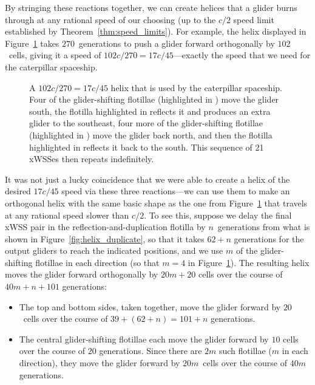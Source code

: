 By stringing these reactions together, we can create helices that a glider burns through at any rational speed of our choosing (up to the $c/2$ speed limit established by Theorem~\ref{thm:speed_limits}). For example, the helix displayed in Figure~\ref{fig:caterpillar_helix} takes $270$~generations to push a glider forward orthogonally by $102$~cells, giving it a speed of $102c/270 = 17c/45$---exactly the speed that we need for the caterpillar spaceship.

\begin{figure}[!htb]
	\centering
	\caption{A $102c/270 = 17c/45$ helix that is used by the caterpillar spaceship. Four of the glider-shifting flotillae (highlighted in ) move the glider south, the flotilla highlighted in  reflects it and produces an extra glider to the southeast, four more of the glider-shifting flotillae (highlighted in ) move the glider back north, and then the flotilla highlighted in  reflects it back to the south. This sequence of 21 xWSSes then repeats indefinitely.}\label{fig:caterpillar_helix}
\end{figure}

It was not just a lucky coincidence that we were able to create a helix of the desired $17c/45$ speed via these three reactions---we can use them to make an orthogonal helix with the same basic shape as the one from Figure~\ref{fig:caterpillar_helix} that travels at any rational speed slower than $c/2$. To see this, suppose we delay the final xWSS pair in the reflection-and-duplication flotilla by $n$~generations from what is shown in Figure~\ref{fig:helix_duplicate}, so that it takes $62 + n$ generations for the output gliders to reach the indicated positions, and we use $m$ of the glider-shifting flotillae in each direction (so that $m = 4$ in Figure~\ref{fig:caterpillar_helix}). The resulting helix moves the glider forward orthogonally by $20m + 20$ cells over the course of $40m + n + 101$ generations:\smallskip

\begin{itemize}
	\item The top and bottom sides, taken together, move the glider forward by $20$~cells over the course of $39 + (62 + n) = 101 + n$ generations.\smallskip
	
	\item The central glider-shifting flotillae each move the glider forward by $10$ cells over the course of $20$ generations. Since there are $2m$ such flotillae ($m$ in each direction), they move the glider forward by $20m$~cells over the course of $40m$ generations.\smallskip
\end{itemize}

